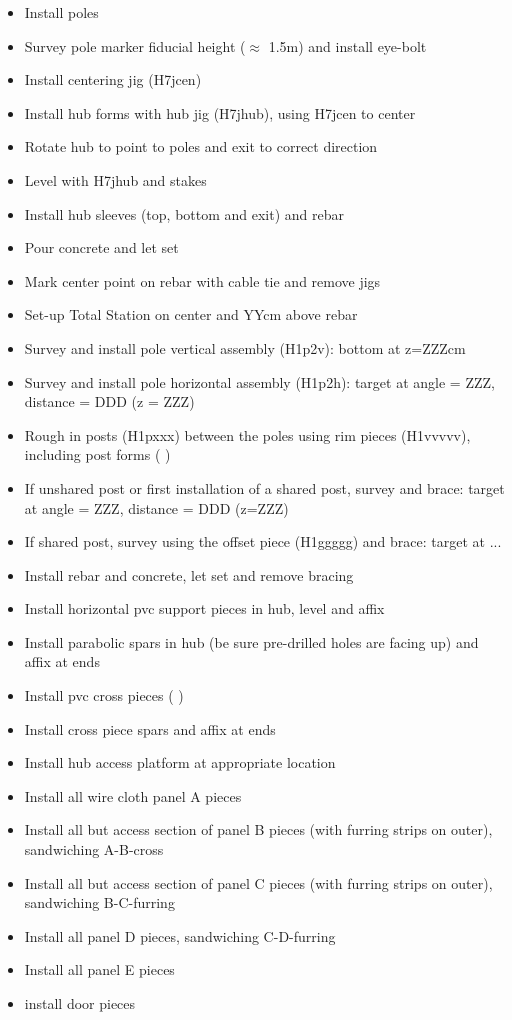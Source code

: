\documentclass[11pt]{article}
\begin{document}
\renewcommand{\labelitemi}{$\boxempty$}
\begin{itemize}
\item Install poles
\item Survey pole marker fiducial height ($\approx$ 1.5m) and install eye-bolt
\item Install centering jig (H7jcen)
\item Install hub forms with hub jig (H7jhub), using H7jcen to center
\item Rotate hub to point to poles and exit to correct direction
\item Level with H7jhub and stakes
\item Install hub sleeves (top, bottom and exit) and rebar
\item Pour concrete and let set
\item Mark center point on rebar with cable tie and remove jigs
\item Set-up Total Station on center and YYcm above rebar
\item Survey and install pole vertical assembly (H1p2v):  bottom at z=ZZZcm
\item Survey and install pole horizontal assembly (H1p2h):  target at angle = ZZZ, distance = DDD (z = ZZZ)
\item Rough in posts (H1pxxx) between the poles using rim pieces (H1vvvvv), including post forms (   )
\item If unshared post or first installation of a shared post, survey and brace:  target at angle = ZZZ, distance = DDD (z=ZZZ)
\item If shared post, survey using the offset piece (H1ggggg) and brace:  target at ...
\item Install rebar and concrete,  let set and remove bracing
\item Install horizontal pvc support pieces in hub, level and affix
\item Install parabolic spars in hub (be sure pre-drilled holes are facing up) and affix at ends
\item Install pvc cross pieces ( )
\item Install cross piece spars and affix at ends
\item Install hub access platform at appropriate location
\item Install all wire cloth panel A pieces
\item Install all but access section of panel B pieces (with furring strips on outer), sandwiching A-B-cross
\item Install all but access section of panel C pieces (with furring strips on outer), sandwiching B-C-furring
\item Install all panel D pieces, sandwiching C-D-furring
\item Install all panel E pieces
\item install door pieces
\end{itemize}



\end{document}
